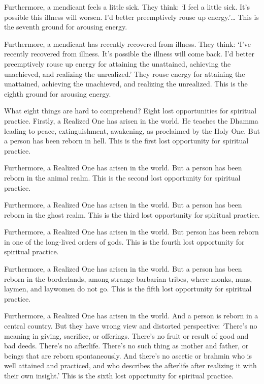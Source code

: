 \documentclass[12pt,openany]{book}%
\begin{document}
Furthermore, a mendicant feels a little sick. They think: ‘I feel a little sick. It’s possible this illness will worsen. I’d better preemptively rouse up energy.’… This is the seventh ground for arousing energy. 

Furthermore, a mendicant has recently recovered from illness. They think: ‘I’ve recently recovered from illness. It’s possible the illness will come back. I’d better preemptively rouse up energy for attaining the unattained, achieving the unachieved, and realizing the unrealized.’ They rouse energy for attaining the unattained, achieving the unachieved, and realizing the unrealized. This is the eighth ground for arousing energy. 

What eight things are hard to comprehend? Eight lost opportunities for spiritual practice. Firstly, a Realized One has arisen in the world. He teaches the Dhamma leading to peace, extinguishment, awakening, as proclaimed by the Holy One. But a person has been reborn in hell. This is the first lost opportunity for spiritual practice. 

Furthermore, a Realized One has arisen in the world. But a person has been reborn in the animal realm. This is the second lost opportunity for spiritual practice. 

Furthermore, a Realized One has arisen in the world. But a person has been reborn in the ghost realm. This is the third lost opportunity for spiritual practice. 

Furthermore, a Realized One has arisen in the world. But person has been reborn in one of the long-lived orders of gods. This is the fourth lost opportunity for spiritual practice. 

Furthermore, a Realized One has arisen in the world. But a person has been reborn in the borderlands, among strange barbarian tribes, where monks, nuns, laymen, and laywomen do not go. This is the fifth lost opportunity for spiritual practice. 

Furthermore, a Realized One has arisen in the world. And a person is reborn in a central country. But they have wrong view and distorted perspective: ‘There’s no meaning in giving, sacrifice, or offerings. There’s no fruit or result of good and bad deeds. There’s no afterlife. There’s no such thing as mother and father, or beings that are reborn spontaneously. And there’s no ascetic or brahmin who is well attained and practiced, and who describes the afterlife after realizing it with their own insight.’ This is the sixth lost opportunity for spiritual practice. 
\end{document}
